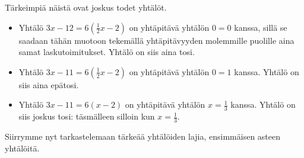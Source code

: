 Tärkeimpiä näistä ovat joskus todet yhtälöt.

\begin{esimerkki}
	\begin{itemize}
		\item{Yhtälö $3x-12=6(\frac{1}{2}x-2)$ on yhtäpitävä yhtälön $0=0$ kanssa, sillä se saadaan tähän muotoon 
		tekemällä yhtäpitävyyden molemmille puolille aina samat laskutoimitukset. Yhtälö on siis aina tosi.}
		\item{Yhtälö $3x-11=6(\frac{1}{2}x-2)$ on yhtäpitävä yhtälön $0=1$ kanssa. Yhtälö on siis aina epätosi.}
		\item{Yhtälö $3x-11=6(x-2)$ on yhtäpitävä yhtälön $x=\frac{1}{3}$ kanssa. Yhtälö on siis joskus tosi: täsmälleen silloin kun $x=\frac{1}{3}$.}
	\end{itemize}

\end{esimerkki}



Siirrymme nyt tarkastelemaan tärkeää yhtälöiden lajia, ensimmäisen asteen yhtälöitä.
